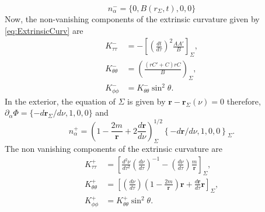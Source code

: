 \begin{equation}
\label{eq:NormalToSigmaIN}
	n_{\alpha}^{-} = \{0, B(r_{\Sigma},t), 0,0\}
\end{equation} 
Now, the non-vanishing components of the extrinsic curvature given by \ref{eq:ExtrinsicCurv} are
\begin{align}
	\label{eq:ExtrinsicCurvInt1}
	K_{\tau\tau}^{-} &= - \left[\left(\frac{dt}{d\tau}\right)^2\frac{AA'}{B}\right]_{\Sigma}, \\	\label{eq:ExtrinsicCurvInt2}
	K_{\theta\theta}^{-} &= \left(\frac{(rC' +C)rC}{B}\right)_{\Sigma},\\
	K_{\phi\phi}^{-} &=  K_{\theta\theta}^{-}\sin^2 \theta.
\end{align}
In the exterior, the equation of $\Sigma$ is given by $\textbf{r} - \textbf{r}_{\Sigma}(\nu)=0$ therefore, $\partial_\alpha \Phi = \{ -d\textbf{r}_{\Sigma} / d\nu, 1, 0, 0\}$ and
\begin{equation}
	n_{\alpha}^{+} = \left(1 - \frac{2m}{\textbf{r}} + 2 \frac{d\textbf{r}}{d\nu}\right)_{\Sigma}^{1/2} \left\{ -d\textbf{r} / d\nu, 1, 0, 0\right\}_{\Sigma}.
\end{equation}
The non vanishing components of the extrinsic curvature are
\begin{align}
	\label{eq:ExtrinsicCurvExt1}
		K_{\tau\tau}^{+} &= \left[\frac{d^2\nu}{d\tau^2} \left(\frac{d\nu}{d\tau}\right)^{-1} - \left(\frac{d\nu}{d\tau}\right)\frac{m}{\textbf{r}} \right]_{\Sigma}, \\\label{eq:ExtrinsicCurvExt2}
			K_{\theta\theta}^{+} &= \left[\left(\frac{d\nu}{d\tau}\right)\left(1 - \frac{2m}{\textbf{r}}\right)\textbf{r} + \frac{d\textbf{r}}{d\tau}\textbf{r}\right]_{\Sigma},\\\label{eq:ExtrinsicCurvExt3}
		K_{\phi\phi}^{+} &=  K_{\theta\theta}^{+}\sin^2 \theta	.		
\end{align}

